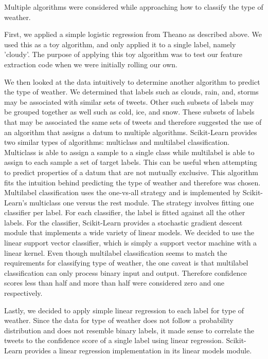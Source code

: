 \documentclass{article}
\begin{document}
Multiple algorithms were considered while approaching how to classify the type of weather.

First, we applied a simple logistic regression from Theano as described above. We used this as a toy algorithm, and only applied it to a single label, namely 'cloudy'. The purpose of applying this toy algorithm was to test our feature extraction code when we were initially rolling our own.

We then looked at the data intuitively to determine another algorithm to predict the type of weather. We determined that labels such as clouds, rain, and, storms may be associated with similar sets of tweets. Other such subsets of labels may be grouped together as well such as cold, ice, and snow. These subsets of labels that may be associated the same sets of tweets and therefore suggested the use of an algorithm that assigns a datum to multiple algorithms. Scikit-Learn provides two similar types of algorithms: multiclass and multilabel classification. Multiclass is able to assign a sample to a single class while multilabel is able to assign to each sample a set of target labels. This can be useful when attempting to predict properties of a datum that are not mutually exclusive. This algorithm fits the intuition behind predicting the type of weather and therefore was chosen. Multilabel classification uses the one-vs-all strategy and is implemented by Scikit-Learn's multiclass one versus the rest module. The strategy involves fitting one classifier per label. For each classifier, the label is fitted against all the other labels. For the classifier, Scikit-Learn provides a stochastic gradient descent module that implements a wide variety of linear models. We decided to use the linear support vector classifier, which is simply a support vector machine with a linear kernel. Even though multilabel classification seems to match the requirements for classifying type of weather, the one caveat is that multilabel classification can only process binary input and output. Therefore confidence scores less than half and more than half were considered zero and one respectively.


Lastly, we decided to apply simple linear regression to each label for type of weather. Since the data for type of weather does not follow a probability distribution and does not resemble binary labels, it made sense to correlate the tweets to the confidence score of a single label using linear regression. Scikit-Learn provides a linear regression implementation in its linear models module.
\end{document}
